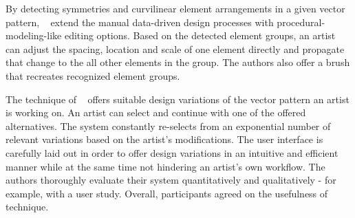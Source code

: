 By detecting symmetries and curvilinear element arrangements in a given vector pattern, \citeauthor*{yeh_2009_dsa}~\cite{yeh_2009_dsa} extend the manual data-driven design processes with procedural-modeling-like editing options. Based on the detected element groups, an artist can adjust the spacing, location and scale of one element directly and propagate that change to the all other elements in the group. The authors also offer a brush that recreates recognized element groups.

The technique of \citeauthor*{guerrero_2016_pep}~\cite{guerrero_2016_pep} offers suitable design variations of the vector pattern an artist is working on. An artist can select and continue with one of the offered alternatives. The system constantly re-selects from an exponential number of relevant variations based on the artist's modifications. The user interface is carefully laid out in order to offer design variations in an intuitive and efficient manner while at the same time not hindering an artist's own workflow. The authors thoroughly evaluate their system quantitatively and qualitatively - for example, with a user study. Overall, participants agreed on the usefulness of technique.


